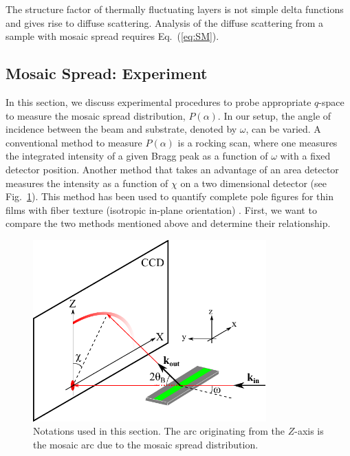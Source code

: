 The structure factor of thermally fluctuating layers is not simple delta functions
and gives rise to diffuse scattering. Analysis of the diffuse scattering 
from a sample with mosaic spread requires Eq.~(\ref{eq:SM}).

\subsection{Mosaic Spread: Experiment}\label{app:mosaic_exp}
In this section, we discuss experimental procedures to probe appropriate 
$q$-space
to measure the mosaic spread distribution, $P(\alpha)$. In our setup, the angle of 
incidence between the beam and substrate, denoted by $\omega$, can be varied. A 
conventional method to measure $P(\alpha)$ is a rocking scan, where
one measures the integrated intensity of a given Bragg peak as a function of 
$\omega$ with a fixed detector position. Another method that takes an advantage
of an area detector \cite{Rodriguez-Navarro07} 
measures the intensity as a function of $\chi$ on a two
dimensional detector (see Fig.~\ref{fig:ring_setup}). This method has been used
to quantify complete pole figures for thin films with fiber texture (isotropic 
in-plane orientation) \cite{Baker10}.
First, we want to compare the two methods mentioned 
above and determine their relationship.

\begin{figure}
  \centering
  \includegraphics[width=0.8\textwidth]{figures/ripple/mosaic/ring_setup}
  \caption{Notations used in this section. The arc originating from the $Z$-axis
  is the mosaic arc due to the mosaic spread distribution.}
  \label{fig:ring_setup}
\end{figure}

